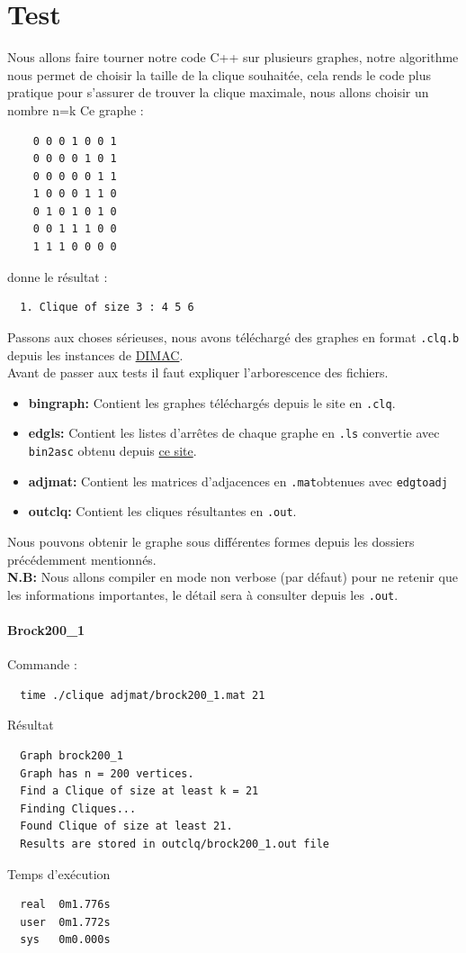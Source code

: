\documentclass{article}
\begin{document}
\section{Test}
Nous allons faire tourner notre code C++ sur plusieurs graphes, notre algorithme
nous permet de choisir la taille de la clique souhaitée, cela rends le code plus pratique
pour s'assurer de trouver la clique maximale, nous allons choisir un nombre n=k
Ce graphe :
\begin{center}
  \begin{verbatim}
    0 0 0 1 0 0 1
    0 0 0 0 1 0 1
    0 0 0 0 0 1 1
    1 0 0 0 1 1 0
    0 1 0 1 0 1 0
    0 0 1 1 1 0 0
    1 1 1 0 0 0 0
  \end{verbatim}
\end{center}
donne le résultat :
\begin{center}
  \begin{verbatim}
  1. Clique of size 3 : 4 5 6
  \end{verbatim}
\end{center}
Passons aux choses sérieuses, nous avons téléchargé des graphes en format \texttt{.clq.b} depuis les
instances de \href{https://cse.unl.edu/~tnguyen/npbenchmarks/clique.html}{DIMAC}. \\
Avant de passer aux tests il faut expliquer l'arborescence des fichiers.
\begin{itemize}
  \item \textbf{bingraph:} Contient les graphes téléchargés depuis le site en \texttt{.clq}.
  \item \textbf{edgls:} Contient les listes d'arrêtes de chaque graphe en \texttt{.ls} convertie avec \texttt{bin2asc}
    obtenu depuis \href{https://cse.unl.edu/~tnguyen/npbenchmarks/instances/converter.tar.gz}{ce site}.
  \item \textbf{adjmat:} Contient les matrices d'adjacences en \texttt{.mat}obtenues avec \texttt{edgtoadj}
  \item \textbf{outclq:} Contient les cliques résultantes en \texttt{.out}.
\end{itemize}
Nous pouvons obtenir le graphe sous différentes formes depuis les dossiers précédemment mentionnés.\\
\textbf{N.B:} Nous allons compiler en mode non verbose (par défaut) pour ne retenir que les informations
importantes, le détail sera à consulter depuis les \texttt{.out}.
\paragraph{Brock200\_1}
Commande :
\begin{verbatim}
  time ./clique adjmat/brock200_1.mat 21
\end{verbatim}
Résultat
\begin{verbatim}
  Graph brock200_1
  Graph has n = 200 vertices.
  Find a Clique of size at least k = 21
  Finding Cliques...
  Found Clique of size at least 21.
  Results are stored in outclq/brock200_1.out file
\end{verbatim}
Temps d'exécution
\begin{verbatim}
  real	0m1.776s
  user	0m1.772s
  sys	0m0.000s
\end{verbatim}
\end{document}
